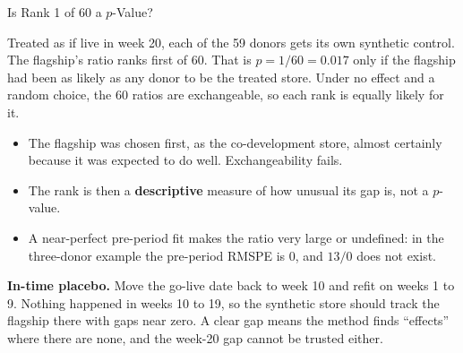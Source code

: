 \documentclass[aspectratio=169, 11pt, handout]{beamer}
\begin{document}
\begin{frame}{Is Rank 1 of 60 a $p$-Value?}

Treated as if live in week 20, each of the 59 donors gets its own synthetic control. The flagship's ratio ranks first of 60. That is $p = 1/60 = 0.017$ only if the flagship had been as likely as any donor to be the treated store. Under no effect and a random choice, the 60 ratios are exchangeable, so each rank is equally likely for it.

\medskip

\begin{itemize}
  \item The flagship was chosen first, as the co-development store, almost certainly because it was expected to do well. Exchangeability fails.
  \item The rank is then a \textbf{descriptive} measure of how unusual its gap is, not a $p$-value.
  \item A near-perfect pre-period fit makes the ratio very large or undefined: in the three-donor example the pre-period RMSPE is 0, and $13/0$ does not exist.
\end{itemize}

\medskip

\textbf{In-time placebo.} Move the go-live date back to week 10 and refit on weeks 1 to 9. Nothing happened in weeks 10 to 19, so the synthetic store should track the flagship there with gaps near zero. A clear gap means the method finds ``effects'' where there are none, and the week-20 gap cannot be trusted either.
\end{frame}
\end{document}
